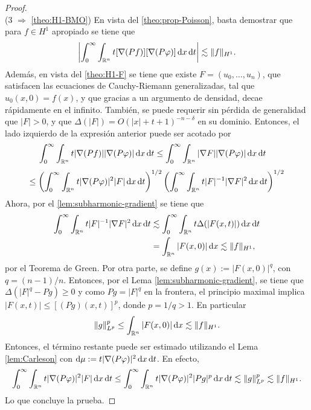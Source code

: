 \begin{proof}
\begin{equation*}
	\end{equation*}
	(3 $\Rightarrow$ \cref{theo:H1-BMO}) En vista del \cref{theo:prop-Poisson}, basta demostrar que para $f\in H^1$ apropiado se tiene que 
	\begin{equation*}
		\left| \int_0^\infty \int_{\mathbb{R}^n} t[\nabla(Pf)][\nabla(P\varphi)]\mathop{}\!\mathrm{d} x \mathop{}\!\mathrm{d} t
		\right| \lesssim \|f\|_{H^1}.
	\end{equation*}
	Además, en vista del \cref{theo:H1-F} se tiene que existe $F=(u_0,\ldots, u_n)$, que satisfacen las ecuaciones de Cauchy-Riemann generalizadas, tal que $u_0(x, 0)=f(x)$, y que gracias a un argumento de densidad, decae rápidamente en el infinito. También, se puede requerir sin pérdida de generalidad que $|F|>0$, y que $\Delta(|F|) = O(|x|+t+1)^{-n-\delta}$ en su dominio. Entonces, el lado izquierdo de la expresión anterior puede ser acotado por 
	\begin{align*}
		\int_0^\infty \int_{\mathbb{R}^n} t|\nabla(Pf)||\nabla(P\varphi)|\mathop{}\!\mathrm{d} x \mathop{}\!\mathrm{d} t & \leq\int_0^\infty \int_{\mathbb{R}^n}  |\nabla F||\nabla(P\varphi)|\mathop{}\!\mathrm{d} x\mathop{}\!\mathrm{d} t
	\end{align*}
	\begin{equation*}
		\leq \left( \int_0^\infty \int_{\mathbb{R}^n} t|\nabla(P\varphi)|^2|F| \mathop{}\!\mathrm{d} x \mathop{}\!\mathrm{d} t
		\right)^{1/2}\left(\int_0^\infty \int_{\mathbb{R}^n}  t|F|^{-1}|\nabla F|^2 \mathop{}\!\mathrm{d} x \mathop{}\!\mathrm{d} t
		\right)^{1/2}
	\end{equation*}
	Ahora, por el \cref{lem:subharmonic-gradient} se tiene que
	\begin{align*}
		\int_0^\infty\int_{\mathbb{R}^n} t|F|^{-1}|\nabla F|^2 \mathop{}\!\mathrm{d} x \mathop{}\!\mathrm{d} t & \lesssim
		\int_0^\infty\int_{\mathbb{R}^n} t\Delta(|F(x, t)|) \mathop{}\!\mathrm{d} x \mathop{}\!\mathrm{d} t \\
		& = \int_{\mathbb{R}^n} |F(x, 0)| \mathop{}\!\mathrm{d} x \lesssim \|f\|_{H^1},
	\end{align*}
	por el Teorema de Green. Por otra parte, se define $g(x):=|F(x, 0)|^q$, con $q=(n-1)/n$. Entonces, por el Lema \ref{lem:subharmonic-gradient}, se tiene que $\Delta(|F|^q - Pg)\geq 0$ y como $Pg = |F|^q$ en la frontera, el principio maximal implica $|F(x, t)| \leq [(Pg)(x, t)]^p$, donde $p=1/q>1$. En particular
	\begin{equation*}
		\|g\|_{L^p}^p \leq \int_{\mathbb{R}^n}|F(x, 0)|\mathop{}\!\mathrm{d} x \lesssim \|f\|_{H^1}.
	\end{equation*}
	Entonces, el término restante puede ser estimado utilizando el Lema \ref{lem:Carleson} con $\mathop{}\!\mathrm{d}\mu := t|\nabla(P\varphi)|^2 \mathop{}\!\mathrm{d} x \mathop{}\!\mathrm{d} t$. En efecto,
	\begin{equation*}
		\int_0^\infty \int_{\mathbb{R}^n} t|\nabla(P\varphi)|^2|F| \mathop{}\!\mathrm{d} x \mathop{}\!\mathrm{d} t \leq \int_0^\infty \int_{\mathbb{R}^n} t|\nabla(P\varphi)|^2|Pg|^p \mathop{}\!\mathrm{d} x \mathop{}\!\mathrm{d} t \lesssim \|g\|_{L^p}^p \lesssim \|f\|_{H^1}.
	\end{equation*}
	Lo que concluye la prueba.
\end{proof} 
